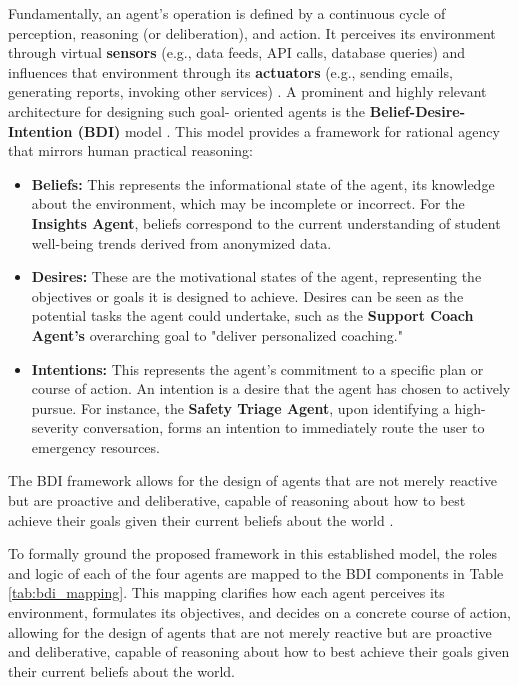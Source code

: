 Fundamentally, an agent's operation is defined by a continuous cycle of perception, reasoning (or deliberation), and action. It perceives its environment through virtual \textbf{sensors} (e.g., data feeds, API calls, database queries) and influences that environment through its \textbf{actuators} (e.g., sending emails, generating reports, invoking other services) \cite{yan2024explainablebdi}. A prominent and highly relevant architecture for designing such goal- oriented agents is the \textbf{Belief-Desire-Intention (BDI)} model \cite{rao1995bdi, yan2024explainablebdi}. This model provides a framework for rational agency that mirrors human practical reasoning:

\begin{itemize}
    \item \textbf{Beliefs:} This represents the informational state of the agent, its knowledge about the environment, which may be incomplete or incorrect. For the \textbf{Insights Agent}, beliefs correspond to the current understanding of student well-being trends derived from anonymized data.
    \item \textbf{Desires:} These are the motivational states of the agent, representing the objectives or goals it is designed to achieve. Desires can be seen as the potential tasks the agent could undertake, such as the \textbf{Support Coach Agent's} overarching goal to "deliver personalized coaching."
    \item \textbf{Intentions:} This represents the agent's commitment to a specific plan or course of action. An intention is a desire that the agent has chosen to actively pursue. For instance, the \textbf{Safety Triage Agent}, upon identifying a high-severity conversation, forms an intention to immediately route the user to emergency resources.
\end{itemize}

The BDI framework allows for the design of agents that are not merely reactive but are proactive and deliberative, capable of reasoning about how to best achieve their goals given their current beliefs about the world \cite{wooldridge2009introductionmas, rao1995bdi}.

To formally ground the proposed framework in this established model, the roles and logic of each of the four agents are mapped to the BDI components in Table \ref{tab:bdi_mapping}. This mapping clarifies how each agent perceives its environment, formulates its objectives, and decides on a concrete course of action, allowing for the design of agents that are not merely reactive but are proactive and deliberative, capable of reasoning about how to best achieve their goals given their current beliefs about the world.

